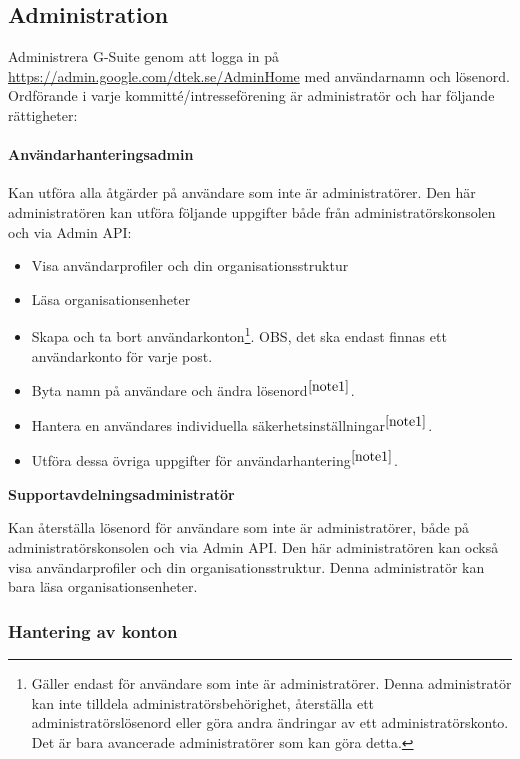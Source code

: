 \subsection{Administration}

Administrera G-Suite genom att logga in på \url{https://admin.google.com/dtek.se/AdminHome} med användarnamn och lösenord. Ordförande i varje kommitté/intresseförening är administratör och har följande rättigheter:

\paragraph{Användarhanteringsadmin}
Kan utföra alla åtgärder på användare som inte är administratörer. Den här administratören kan utföra följande uppgifter både från administratörskonsolen och via Admin API:

\begin{itemize}
    \item Visa användarprofiler och din organisationsstruktur
    \item Läsa organisationsenheter
    \item Skapa och ta bort användarkonton\footnote{\label{note1}Gäller endast för användare som inte är administratörer. Denna administratör kan inte tilldela administratörsbehörighet, återställa ett administratörslösenord eller göra andra ändringar av ett administratörskonto. Det är bara avancerade administratörer som kan göra detta.}. OBS, det ska endast finnas ett användarkonto för varje post.
    \item Byta namn på användare och ändra lösenord$^{\ref{note1}}$.
    \item Hantera en användares individuella säkerhetsinställningar$^{\ref{note1}}$.
    \item Utföra dessa övriga uppgifter för användarhantering$^{\ref{note1}}$.
\end{itemize}


\textbf{Supportavdelningsadministratör}

Kan återställa lösenord för användare som inte är administratörer, både på administratörskonsolen och via Admin API. Den här administratören kan också visa användarprofiler och din organisationsstruktur. Denna administratör kan bara läsa organisationsenheter.

\subsubsection{Hantering av konton}

